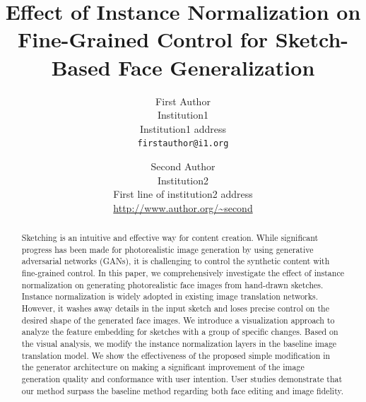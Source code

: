 \documentclass[10pt,twocolumn,letterpaper]{article}
\begin{document}
\title{Effect of Instance Normalization on Fine-Grained Control for Sketch-Based Face Generalization}

\author{First Author\\
Institution1\\
Institution1 address\\
{\tt\small firstauthor@i1.org}
\and
Second Author\\
Institution2\\
First line of institution2 address\\
{\small\url{http://www.author.org/~second}}
}

\maketitle

\begin{abstract}
 Sketching is an intuitive and effective way for content creation. While significant progress has been made for photorealistic image generation by using generative adversarial networks (GANs), it is challenging to control the synthetic content with fine-grained control.  
 In this paper, we comprehensively investigate the effect of instance normalization on generating photorealistic face images from hand-drawn sketches.
 Instance normalization is widely adopted in existing image translation networks. However, it washes away details in the input sketch and loses precise control on the desired shape of the generated face images. 
 We introduce a visualization approach to analyze the feature embedding for sketches with a group of specific changes.  
 Based on the visual analysis, we modify the instance normalization layers in the baseline image translation model. 
 We show the effectiveness of the proposed simple modification in the generator architecture on making a significant improvement of the image generation quality and conformance with user intention. 
 User studies demonstrate that our method surpass the baseline method regarding both face editing and image fidelity.
    
\end{abstract}

\end{document}
